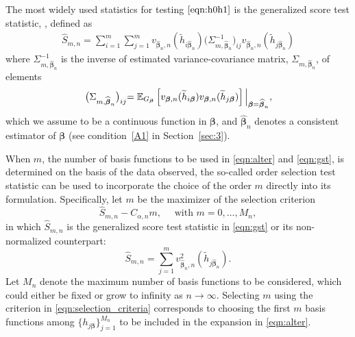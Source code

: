 \documentclass[11pt]{article}
\newcommand{\vect}[1]{\boldsymbol{#1}}
\begin{document}
The most widely used statistics for testing $\eqref{eqn:h0h1}$ is the generalized score test statistic, \citep[cfr.][]{javitz1975generalized,david1979}, defined as 
\begin{equation}
    \begin{aligned}
\widehat{S}_{m,n}  
= \sum_{i=1}^m \sum_{j=1}^m v_{\widehat{\vect{\beta}}_n,n}(\widetilde{h}_{i\widehat{\vect{\beta}}_n})\bigl(\Sigma^{-1}_{m,\widehat{\vect{\beta}}_n}\bigl)_{ij} v_{\widehat{\vect{\beta}}_n,n}(\widetilde{h}_{j\widehat{\vect{\beta}}_n})
\label{eqn:gst}
    \end{aligned}
\end{equation}  
where $\Sigma^{-1}_{m,\widehat{\vect{\beta}}_n}$ is the inverse of estimated variance-covariance matrix, ${\Sigma}_{m,\widehat{\vect{\beta}}_n}$, of elements
$$\bigl({\Sigma}_{m,\widehat{\vect{\beta}}_n}\bigl)_{ij} = \mathbb{E}_{G_{\vect{{\beta}}}}\left[v_{\vect{\beta},n}(\widetilde{h}_{i{\vect{\beta}}})v_{\vect{\beta},n}(\widetilde{h}_{j{\vect{\beta}}})\right]\Bigl|_{\vect{\beta}=\vect{\widehat{\beta}}_n},$$ 
which we assume to be a continuous function in $\vect{\beta}$, and 
$\widehat{\vect{\beta}}_n$ denotes a consistent estimator of $\vect{\beta}$ (see condition~\ref{A1} in Section~\ref{sec:3}). 

When $m$, the number of basis functions to be used in \eqref{eqn:alter} and \eqref{eqn:gst}, is determined on the basis of the data observed, the so-called order selection test statistic \citep[cfr.][]{marc1999} can be used to incorporate the choice of the order $m$ directly into its formulation.
Specifically, let $m$ be the maximizer of the selection criterion
\begin{equation}
\widehat{S}_{m,n} - C_{\alpha,n} m, \quad \text{ with } m=0,\dots, M_n,
\label{eqn:selection_criteria}
\end{equation}
in which $\widehat{S}_{m,n}$ is the generalized score test statistic in \eqref{eqn:gst} or its non-normalized counterpart:
\begin{equation}
\widehat{S}_{m,n} = \sum_{j=1}^m v^2_{\widehat{\vect{\beta}}_n,n}(\widetilde{h}_{j\widehat{\vect{\beta}}_n}).
\label{eqn:non_norm}
\end{equation}
Let $M_n$ denote the maximum number of basis functions to be considered, which could either be fixed or grow to infinity as $n\to\infty.$ Selecting   $m$ using the criterion in \eqref{eqn:selection_criteria} corresponds to choosing the first $m$ basis functions among $\{h_{j\vect{\beta}}\}_{j=1}^{M_n}$ to be included in the expansion in \eqref{eqn:alter}. 
\end{document}
